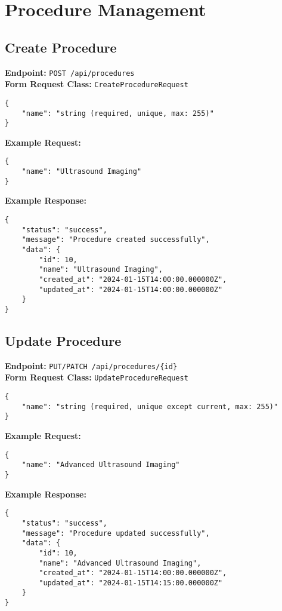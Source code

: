 \documentclass[12pt,a4paper]{article}
\begin{document}
\section{Procedure Management}

\subsection{Create Procedure}
\textbf{Endpoint:} \texttt{POST /api/procedures}\\
\textbf{Form Request Class:} \texttt{CreateProcedureRequest}

\begin{lstlisting}[caption=Create Procedure Request Body]
{
    "name": "string (required, unique, max: 255)"
}
\end{lstlisting}

\textbf{Example Request:}
\begin{lstlisting}[caption=Create Procedure Example Request]
{
    "name": "Ultrasound Imaging"
}
\end{lstlisting}

\textbf{Example Response:}
\begin{lstlisting}[caption=Create Procedure Example Response]
{
    "status": "success",
    "message": "Procedure created successfully",
    "data": {
        "id": 10,
        "name": "Ultrasound Imaging",
        "created_at": "2024-01-15T14:00:00.000000Z",
        "updated_at": "2024-01-15T14:00:00.000000Z"
    }
}
\end{lstlisting}

\subsection{Update Procedure}
\textbf{Endpoint:} \texttt{PUT/PATCH /api/procedures/\{id\}}\\
\textbf{Form Request Class:} \texttt{UpdateProcedureRequest}

\begin{lstlisting}[caption=Update Procedure Request Body]
{
    "name": "string (required, unique except current, max: 255)"
}
\end{lstlisting}

\textbf{Example Request:}
\begin{lstlisting}[caption=Update Procedure Example Request]
{
    "name": "Advanced Ultrasound Imaging"
}
\end{lstlisting}

\textbf{Example Response:}
\begin{lstlisting}[caption=Update Procedure Example Response]
{
    "status": "success",
    "message": "Procedure updated successfully",
    "data": {
        "id": 10,
        "name": "Advanced Ultrasound Imaging",
        "created_at": "2024-01-15T14:00:00.000000Z",
        "updated_at": "2024-01-15T14:15:00.000000Z"
    }
}
\end{lstlisting}
\end{document}

